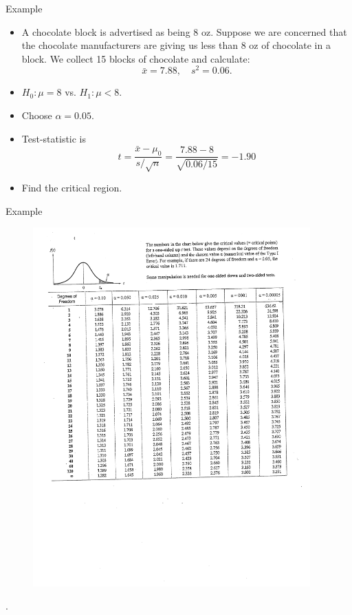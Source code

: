\documentclass[10pt, handout, xcolor=table]{beamer}
\begin{document}
\begin{frame}{Example}
\begin{itemize}
\setlength{\itemsep}{8pt}
\item A chocolate block is advertised as being 8 oz. Suppose we are concerned that the chocolate manufacturers are giving us less than 8 oz of chocolate in a block.  We collect 15 blocks of chocolate and calculate:
$$\bar{x} = 7.88, \quad s^2 = 0.06.$$
\item<1->[Step 1] $H_0: \mu = 8$ vs. $H_1: \mu < 8$.   
\item<2->[Step 2] Choose $\alpha = 0.05$. 
\item<3->[Step 3] Test-statistic is 
$$t = \frac{\bar{x} - \mu_0}{s/\sqrt{n}} = \frac{7.88 - 8}{\sqrt{0.06/15}} = -1.90$$
\item<4->[Step 4]  Find the critical region.
\end{itemize}
\end{frame}

\begin{frame}{Example}
\begin{figure}
\includegraphics[width = 0.95\textwidth]{images/rec11_2}
\end{figure}
.
\end{frame}
\end{document}
